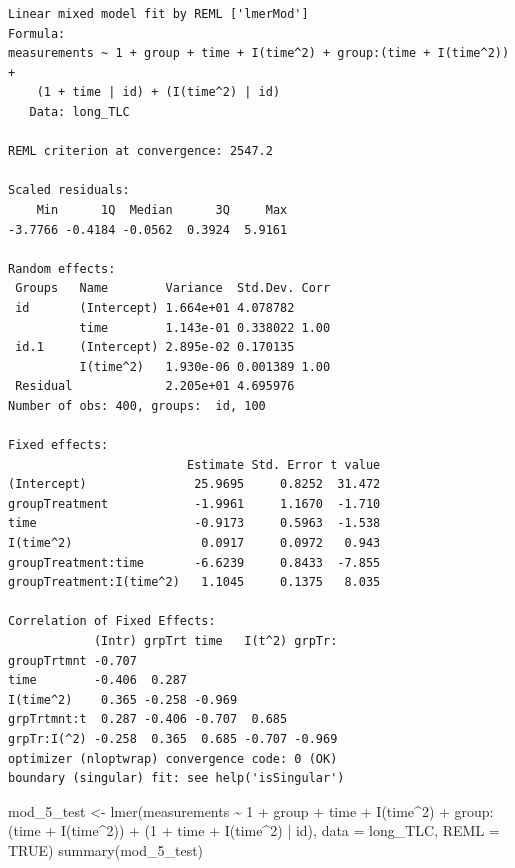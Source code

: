 \documentclass[
  letterpaper,
  DIV=11,
  numbers=noendperiod]{scrreprt}
\newenvironment{Shaded}{\begin{snugshade}}{\end{snugshade}}
\newcommand{\AttributeTok}[1]{\textcolor[rgb]{0.40,0.45,0.13}{#1}}
\newcommand{\ConstantTok}[1]{\textcolor[rgb]{0.56,0.35,0.01}{#1}}
\newcommand{\DecValTok}[1]{\textcolor[rgb]{0.68,0.00,0.00}{#1}}
\newcommand{\FunctionTok}[1]{\textcolor[rgb]{0.28,0.35,0.67}{#1}}
\newcommand{\NormalTok}[1]{\textcolor[rgb]{0.00,0.23,0.31}{#1}}
\newcommand{\OtherTok}[1]{\textcolor[rgb]{0.00,0.23,0.31}{#1}}
\newcommand{\SpecialCharTok}[1]{\textcolor[rgb]{0.37,0.37,0.37}{#1}}
\begin{document}
\begin{verbatim}
Linear mixed model fit by REML ['lmerMod']
Formula: 
measurements ~ 1 + group + time + I(time^2) + group:(time + I(time^2)) +  
    (1 + time | id) + (I(time^2) | id)
   Data: long_TLC

REML criterion at convergence: 2547.2

Scaled residuals: 
    Min      1Q  Median      3Q     Max 
-3.7766 -0.4184 -0.0562  0.3924  5.9161 

Random effects:
 Groups   Name        Variance  Std.Dev. Corr
 id       (Intercept) 1.664e+01 4.078782     
          time        1.143e-01 0.338022 1.00
 id.1     (Intercept) 2.895e-02 0.170135     
          I(time^2)   1.930e-06 0.001389 1.00
 Residual             2.205e+01 4.695976     
Number of obs: 400, groups:  id, 100

Fixed effects:
                         Estimate Std. Error t value
(Intercept)               25.9695     0.8252  31.472
groupTreatment            -1.9961     1.1670  -1.710
time                      -0.9173     0.5963  -1.538
I(time^2)                  0.0917     0.0972   0.943
groupTreatment:time       -6.6239     0.8433  -7.855
groupTreatment:I(time^2)   1.1045     0.1375   8.035

Correlation of Fixed Effects:
            (Intr) grpTrt time   I(t^2) grpTr:
groupTrtmnt -0.707                            
time        -0.406  0.287                     
I(time^2)    0.365 -0.258 -0.969              
grpTrtmnt:t  0.287 -0.406 -0.707  0.685       
grpTr:I(^2) -0.258  0.365  0.685 -0.707 -0.969
optimizer (nloptwrap) convergence code: 0 (OK)
boundary (singular) fit: see help('isSingular')
\end{verbatim}

\begin{Shaded}
\begin{Highlighting}[]
\NormalTok{mod\_5\_test }\OtherTok{\textless{}{-}} \FunctionTok{lmer}\NormalTok{(measurements }\SpecialCharTok{\textasciitilde{}} \DecValTok{1} \SpecialCharTok{+}\NormalTok{ group }\SpecialCharTok{+}\NormalTok{ time }\SpecialCharTok{+} \FunctionTok{I}\NormalTok{(time}\SpecialCharTok{\^{}}\DecValTok{2}\NormalTok{) }\SpecialCharTok{+}\NormalTok{ group}\SpecialCharTok{:}\NormalTok{(time }\SpecialCharTok{+} \FunctionTok{I}\NormalTok{(time}\SpecialCharTok{\^{}}\DecValTok{2}\NormalTok{)) }\SpecialCharTok{+}
\NormalTok{    (}\DecValTok{1} \SpecialCharTok{+}\NormalTok{ time }\SpecialCharTok{+} \FunctionTok{I}\NormalTok{(time}\SpecialCharTok{\^{}}\DecValTok{2}\NormalTok{) }\SpecialCharTok{|}\NormalTok{ id), }\AttributeTok{data =}\NormalTok{ long\_TLC, }\AttributeTok{REML =} \ConstantTok{TRUE}\NormalTok{)}
\FunctionTok{summary}\NormalTok{(mod\_5\_test)}
\end{Highlighting}
\end{Shaded}
\end{document}

